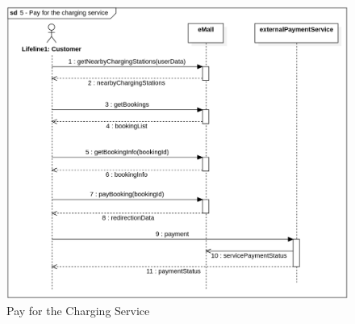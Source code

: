 \begin{figure}[H]
    \begin{center}
        \includegraphics[width=\textwidth]{img/sequence/pay.png}
        \caption{Pay for the Charging Service}
    \end{center}
\end{figure}
\newpage
